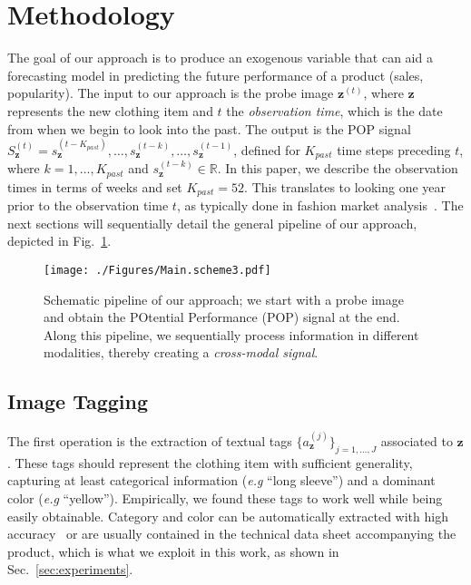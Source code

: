 \documentclass[runningheads]{llncs}
\newcommand{\snamebig}[0] {POP\xspace}
\begin{document}
\section{Methodology}
\label{sec:method}
\sloppy The goal of our approach is to produce an exogenous variable that can aid a forecasting model in predicting the future performance of a product (sales, popularity). The input to our approach is the probe image $\mathbf{z}^{(t)}$, where $\mathbf{z}$ represents the new clothing item and $t$ the \emph{observation time}, which is the date from when we begin to look into the past. The output is the \snamebig signal $S^{(t)}_\mathbf{z}=s^{(t-K_{past})}_\mathbf{z},\ldots,s^{(t-k)}_{\mathbf{z}},\ldots,s^{(t-1)}_{\mathbf{z}}$, defined for $K_{past}$ time steps preceding $t$, where $k = 1, \ldots, K_{past}$ and $s^{(t-k)}_\mathbf{z} \in \mathbb{R}$. In this paper, we describe the observation times in terms of weeks and set $K_{past}=52$. This translates to looking one year prior to the observation time $t$, as typically done in fashion market analysis~\cite{sorger2017fundamentals}. The next sections will sequentially detail the general pipeline of our approach, depicted in Fig.~\ref{fig:Main.scheme2}.

\begin{figure}[t!]
	\centering
	\texttt{[image: ./Figures/Main.scheme3.pdf]}	
	\caption{\footnotesize Schematic pipeline of our approach; we start with a probe image and obtain the POtential Performance (\snamebig) signal at the end. Along this pipeline, we sequentially process information in different modalities, thereby creating a \textit{cross-modal signal}.}
	\label{fig:Main.scheme2}
\end{figure}

\subsection{Image Tagging} The first operation is the extraction of textual tags $\{a_\mathbf{z}^{(j)}\}_{j=1,\ldots,J}$ associated to $\mathbf{z}$. These tags should represent the clothing item with sufficient generality, capturing at least categorical information (\textit{e.g} ``long sleeve'') and a dominant color (\textit{e.g}  ``yellow''). Empirically, we found these tags to work well while being easily obtainable. Category and color can be automatically extracted with high accuracy~\cite{liuLQWTcvpr16DeepFashion} or are usually contained in the technical data sheet accompanying the product, which is what we exploit in this work, as shown in Sec.~\ref{sec:experiments}.
\end{document}
